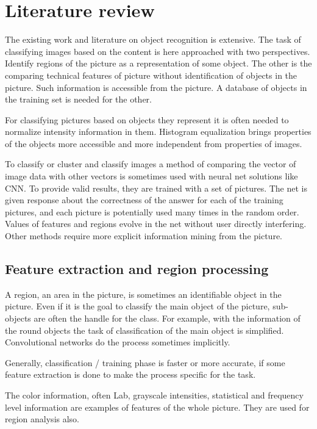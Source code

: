 \documentclass[doc/report.tex]{subfiles}
\begin{document}
\section{Literature review}
The existing work and literature on object recognition is extensive. The task
of classifying images based on the content is here approached with two
perspectives. Identify regions of the picture as a representation of some
object. The other is the comparing technical features of picture without
identification of objects in the picture. Such information is accessible from
the picture. A database of objects in the training set is needed for the other.

For classifying pictures based on objects they represent it is often needed to
normalize intensity information in them. Histogram equalization brings
properties of the objects more accessible and more independent from properties
of images.

To classify or cluster and classify images a method of comparing the vector of
image data with other vectors is sometimes used with neural net solutions like
CNN. To provide valid results, they are trained with a set of pictures. The net
is given response about the correctness of the answer for each of the training
pictures, and each picture is potentially used many times in the random order.
Values of features and regions evolve in the net without user directly
interfering. Other methods require more explicit information mining from the
picture.

\subsection{Feature extraction and region processing}
A region, an area in the picture, is sometimes an identifiable object in the
picture. Even if it is the goal to classify the main object of the picture,
sub-objects are often the handle for the class. For example, with the
information of the round objects the task of classification of the main object
is simplified. Convolutional networks do the process sometimes implicitly.

Generally, classification / training phase is faster or more accurate, if some
feature extraction is done to make the process specific for the task.

The color information, often Lab, grayscale intensities, statistical and
frequency level information are examples of features of the whole picture. They
are used for region analysis also.
\end{document}

